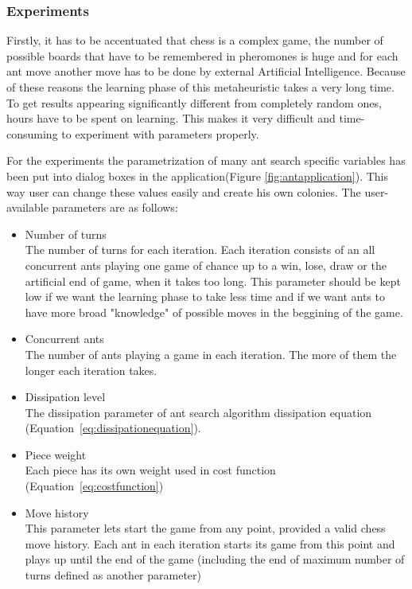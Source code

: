 \documentclass[pdftex]{article}
\begin{document}
\subsubsection{Experiments}

Firstly, it has to be accentuated that chess is a complex game, the number of possible boards that have to be remembered in pheromones is huge and for each ant move another move has to be done by external Artificial Intelligence. Because of these reasons the learning phase of this metaheuristic takes a very long time. To get results appearing significantly different from completely random ones, hours have to be spent on learning. This makes it very difficult and time-consuming to experiment with parameters properly.

For the experiments the parametrization of many ant search specific variables has been put into dialog boxes in the application(Figure \ref{fig:antapplication}). This way user can change these values easily and create his own colonies. The user-available parameters are as follows:

\begin{itemize}
 	\item Number of turns \hfill \\
The number of turns for each iteration. Each iteration consists of an all concurrent ants playing one game of chance up to a win, lose, draw or the artificial end of game, when it takes too long. This parameter should be kept low if we want the learning phase to take less time and if we want ants to have more broad "knowledge" of possible moves in the beggining of the game. 
	\item Concurrent ants \hfill \\
The number of ants playing a game in each iteration. The more of them the longer each iteration takes.
 	\item Dissipation level \hfill \\
The dissipation parameter of ant search algorithm dissipation equation (Equation~\ref{eq:dissipationequation}).
	\item Piece weight \hfill \\
Each piece has its own weight used in cost function (Equation~\ref{eq:costfunction})
	\item Move history \hfill \\
This parameter lets start the game from any point, provided a valid chess move history. Each ant in each iteration starts its game from this point and plays up until the end of the game (including the end of maximum number of turns defined as another parameter)
\end{itemize}
\end{document}
